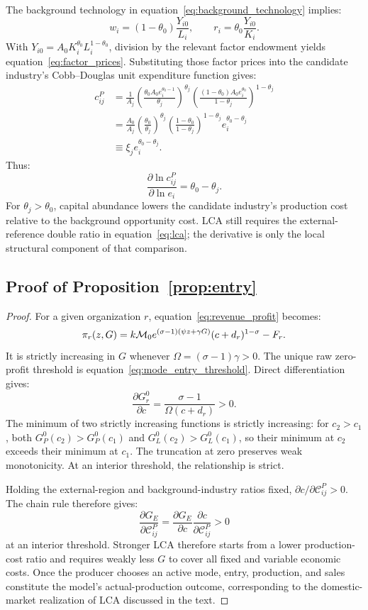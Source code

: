 The background technology in equation~\eqref{eq:background_technology}
implies:
\[
w_i=(1-\theta_0)\frac{Y_{i0}}{L_i},
\qquad
r_i=\theta_0\frac{Y_{i0}}{K_i}.
\]
With \(Y_{i0}=A_0K_i^{\theta_0}L_i^{1-\theta_0}\), division by the relevant
factor endowment yields equation~\eqref{eq:factor_prices}.  Substituting those
factor prices into the candidate industry's Cobb--Douglas unit expenditure
function gives:
\begin{align*}
c^P_{ij}
&=
\frac{1}{A_j}
\left(\frac{\theta_0A_0e_i^{\theta_0-1}}{\theta_j}\right)^{\theta_j}
\left(
\frac{(1-\theta_0)A_0e_i^{\theta_0}}{1-\theta_j}
\right)^{1-\theta_j}\\
&=
\frac{A_0}{A_j}
\left(\frac{\theta_0}{\theta_j}\right)^{\theta_j}
\left(\frac{1-\theta_0}{1-\theta_j}\right)^{1-\theta_j}
e_i^{\theta_0-\theta_j}\\
&\equiv \xi_j e_i^{\theta_0-\theta_j}.
\end{align*}
Thus:
\[
\frac{\partial\ln c^P_{ij}}{\partial\ln e_i}
=\theta_0-\theta_j.
\]
For \(\theta_j>\theta_0\), capital abundance lowers the candidate industry's
production cost relative to the background opportunity cost.  LCA still
requires the external-reference double ratio in equation~\eqref{eq:lca};
the derivative is only the local structural component of that comparison.

\subsection{Proof of Proposition~\ref{prop:entry}}

\begin{proof}
For a given organization \(r\), equation~\eqref{eq:revenue_profit} becomes:
\[
\pi_r(z,G)
=
k\mathcal M_0e^{(\sigma-1)(\psi z+\gamma G)}(c+d_r)^{1-\sigma}
-F_r.
\]
It is strictly increasing in \(G\) whenever \(\Omega=(\sigma-1)\gamma>0\).
The unique raw
zero-profit threshold is equation~\eqref{eq:mode_entry_threshold}.  Direct
differentiation gives:
\[
\frac{\partial G_r^0}{\partial c}
=
\frac{\sigma-1}{\Omega(c+d_r)}>0.
\]
The minimum of two strictly increasing functions is strictly increasing:
for \(c_2>c_1\), both \(G_P^0(c_2)>G_P^0(c_1)\) and
\(G_L^0(c_2)>G_L^0(c_1)\), so their minimum at \(c_2\) exceeds their minimum
at \(c_1\).  The truncation at zero preserves weak monotonicity.  At an
interior threshold, the relationship is strict.

Holding the external-region and background-industry ratios fixed,
\(\partial c/\partial\mathcal C^P_{ij}>0\).  The chain rule therefore gives:
\[
\frac{\partial G_E}{\partial\mathcal C^P_{ij}}
=
\frac{\partial G_E}{\partial c}
\frac{\partial c}{\partial\mathcal C^P_{ij}}>0
\]
at an interior threshold.
Stronger LCA therefore starts from a lower production-cost ratio and requires
weakly less \(G\) to cover all fixed and variable economic costs.  Once the
producer chooses an active mode, entry, production, and sales constitute
the model's actual-production outcome, corresponding to the domestic-market
realization of LCA discussed in the text.
\end{proof}

